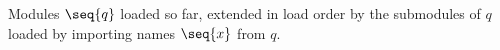 Modules $\seq{q}$ loaded so far, extended in load order by the submodules of $q$ loaded by importing names $\seq{x}$
from $q$.
